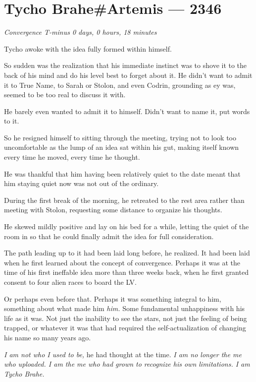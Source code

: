 \hypertarget{tycho-braheartemis-2346}{%
\chapter{Tycho Brahe\#Artemis — 2346}\label{tycho-braheartemis-2346}}

\begin{center}
\emph{Convergence T-minus 0 days, 0 hours, 18 minutes}
\end{center}

\noindent Tycho awoke with the idea fully formed within himself.

So sudden was the realization that his immediate instinct was to shove it to the back of his mind and do his level best to forget about it. He didn't want to admit it to True Name, to Sarah or Stolon, and even Codrin, grounding as ey was, seemed to be too real to discuss it with.

He barely even wanted to admit it to himself. Didn't want to name it, put words to it.

So he resigned himself to sitting through the meeting, trying not to look too uncomfortable as the lump of an idea sat within his gut, making itself known every time he moved, every time he thought.

He was thankful that him having been relatively quiet to the date meant that him staying quiet now was not out of the ordinary.

During the first break of the morning, he retreated to the rest area rather than meeting with Stolon, requesting some distance to organize his thoughts.

He skewed mildly positive and lay on his bed for a while, letting the quiet of the room in so that he could finally admit the idea for full consideration.

The path leading up to it had been laid long before, he realized. It had been laid when he first learned about the concept of convergence. Perhaps it was at the time of his first ineffable idea more than three weeks back, when he first granted consent to four alien races to board the LV.

Or perhaps even before that. Perhaps it was something integral to him, something about what made him \emph{him.} Some fundamental unhappiness with his life as it was. Not just the inability to see the stars, not just the feeling of being trapped, or whatever it was that had required the self-actualization of changing his name so many years ago.

\emph{I am not who I used to be,} he had thought at the time. \emph{I am no longer the me who uploaded. I am the me who had grown to recognize his own limitations. I am Tycho Brahe.}

